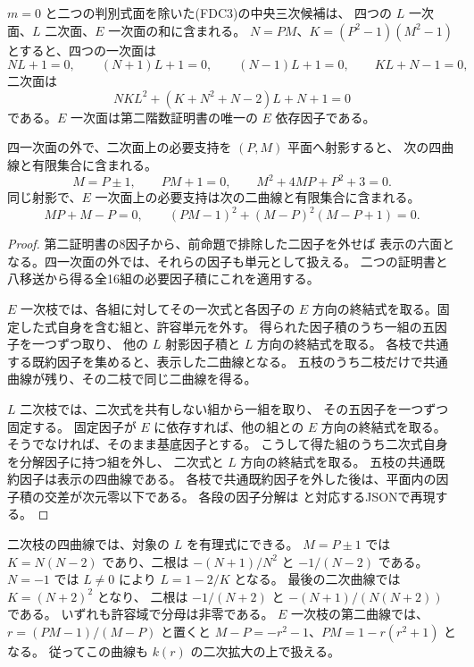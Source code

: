 \begin{proposition}\label{prop:cubic-CY-one-segre-double-split-FDC-projections}
$m=0$ と二つの判別式面を除いた(FDC3)の中央三次候補は、
四つの $L$ 一次面、$L$ 二次面、$E$ 一次面の和に含まれる。
$N=PM$、$K=(P^2-1)(M^2-1)$ とすると、四つの一次面は
\[
 NL+1=0,\qquad (N+1)L+1=0,\qquad (N-1)L+1=0,\qquad KL+N-1=0,
\]
二次面は
\[
 NKL^2+(K+N^2+N-2)L+N+1=0
\]
である。$E$ 一次面は第二階数証明書の唯一の $E$ 依存因子である。

四一次面の外で、二次面上の必要支持を $(P,M)$ 平面へ射影すると、
次の四曲線と有限集合に含まれる。
\[
 M=P\pm1,\qquad PM+1=0,\qquad M^2+4MP+P^2+3=0.
\]
同じ射影で、$E$ 一次面上の必要支持は次の二曲線と有限集合に含まれる。
\[
 MP+M-P=0,\qquad
 (PM-1)^2+(M-P)^2(M-P+1)=0 .
\]
\end{proposition}
\begin{proof}
第二証明書の8因子から、前命題で排除した二因子を外せば
表示の六面となる。四一次面の外では、それらの因子も単元として扱える。
二つの証明書と八移送から得る全16組の必要因子積にこれを適用する。

$E$ 一次枝では、各組に対してその一次式と各因子の
$E$ 方向の終結式を取る。固定した式自身を含む組と、許容単元を外す。
得られた因子積のうち一組の五因子を一つずつ取り、
他の $L$ 射影因子積と $L$ 方向の終結式を取る。
各枝で共通する既約因子を集めると、表示した二曲線となる。
五枝のうち二枝だけで共通曲線が残り、その二枝で同じ二曲線を得る。

$L$ 二次枝では、二次式を共有しない組から一組を取り、
その五因子を一つずつ固定する。
固定因子が $E$ に依存すれば、他の組との $E$ 方向の終結式を取る。
そうでなければ、そのまま基底因子とする。
こうして得た組のうち二次式自身を分解因子に持つ組を外し、
二次式と $L$ 方向の終結式を取る。
五枝の共通既約因子は表示の四曲線である。
各枝で共通既約因子を外した後は、平面内の因子積の交差が次元零以下である。
各段の因子分解は
と対応するJSONで再現する。
\end{proof}

二次枝の四曲線では、対象の $L$ を有理式にできる。
$M=P\pm1$ では $K=N(N-2)$ であり、二根は
$-(N+1)/N^2$ と $-1/(N-2)$ である。
$N=-1$ では $L\ne0$ により $L=1-2/K$ となる。
最後の二次曲線では $K=(N+2)^2$ となり、
二根は $-1/(N+2)$ と $-(N+1)/(N(N+2))$ である。
いずれも許容域で分母は非零である。
$E$ 一次枝の第二曲線では、$r=(PM-1)/(M-P)$ と置くと
$M-P=-r^2-1$、$PM=1-r(r^2+1)$ となる。
従ってこの曲線も $k(r)$ の二次拡大の上で扱える。

